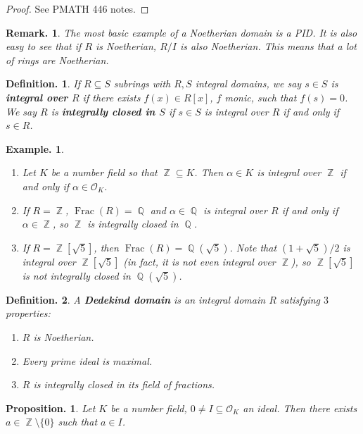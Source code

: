 \documentclass[11pt, a4paper]{memoir}
\DeclareMathOperator{\Q}{{\mathbb{Q}}}
\DeclareMathOperator{\Z}{{\mathbb{Z}}}
\theoremstyle{change}
\newtheorem{proposition}[theorem]{Proposition.}
\theoremstyle{plain}
\theoremstyle{nonumberplain}
\newtheorem{definition}{Definition.}
\newtheorem{example}{Example.}
\newtheorem{remark}{Remark.}
\newtheorem{proof}{Proof}
\DeclareMathOperator{\Frac}{Frac}
\newcommand{\mbf}[1]{{\boldmath\bfseries #1}}
\numberwithin{equation}{section}
\begin{document}
\begin{proof}
    See PMATH 446 notes.
\end{proof}
\begin{remark}
    The most basic example of a Noetherian domain is a PID.
    It is also easy to see that if $R$ is Noetherian, $R/I$ is also Noetherian.
    This means that a lot of rings are Noetherian.
\end{remark}
\begin{definition}
    If $R\subseteq S$ subrings with $R,S$ integral domains, we say $s\in S$ is \mbf{integral over $R$} if there exists $f(x)\in R[x]$, $f$ monic, such that $f(s)=0$.
    We say $R$ is \mbf{integrally closed in $S$} if $s\in S$ is integral over $R$ if and only if $s\in R$.
\end{definition}
\begin{example}
    \begin{enumerate}[nl]
        \item Let $K$ be a number field so that $\Z\subseteq K$.
            Then $\alpha\in K$ is integral over $\Z$ if and only if $\alpha\in\mathcal{O}_K$.
        \item If $R=\Z$, $\Frac(R)=\Q$ and $\alpha\in\Q$ is integral over $R$ if and only if  $\alpha\in\Z$, so $\Z$ is integrally closed in $\Q$.

        \item If $R=\Z[\sqrt{5}]$, then $\Frac(R)=\Q(\sqrt{5})$.
            Note that $(1+\sqrt{5})/2$ is integral over $\Z[\sqrt{5}]$ (in fact, it is not even integral over $\Z$), so $\Z[\sqrt{5}]$ is not integrally closed in $\Q(\sqrt{5})$.
    \end{enumerate}
\end{example}
\begin{definition}
    A \mbf{Dedekind domain} is an integral domain $R$ satisfying $3$ properties:
    \begin{enumerate}[nolistsep]
        \item $R$ is Noetherian.
        \item Every prime ideal is maximal.
        \item $R$ is integrally closed in its field of fractions.
    \end{enumerate}
\end{definition}
\begin{proposition}\label{p:id-scale}
    Let $K$ be a number field, $0\neq I\subseteq\mathcal{O}_K$ an ideal.
    Then there exists $a\in\Z\setminus\{0\}$ such that $a\in I$.
\end{proposition}
\end{document}
